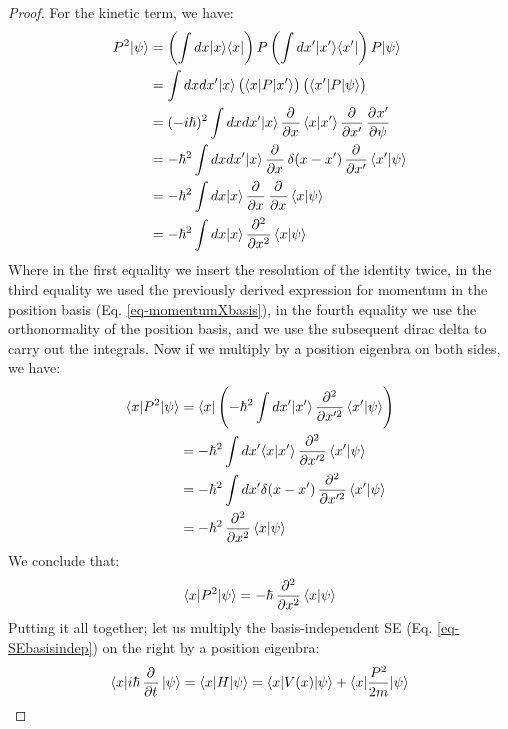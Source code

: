 \begin{proof}
    For the kinetic term, we have:
    \begin{equation}
        \begin{split}
            P^2\ket{\psi} &= \left(\int dx \dyad{x}{x}\right) P \left(\int dx' \dyad{x'}{x'}\right) P\ket{\psi}
            \\ &= \int dxdx' \ket{x}\left(\bra{x}P\ket{x'}\right)\left(\bra{x'}P\ket{\psi}\right)
            \\ &= (-i\hbar)^2 \int dxdx' \ket{x} \dpd{}{x}\braket{x}{x'} \dpd{}{x'}\dpd{x'}{\psi}
            \\ &= -\hbar^2 \int dxdx' \ket{x}\dpd{}{x}\delta(x-x')\dpd{}{x'}\braket{x'}{\psi}
            \\ &= -\hbar^2 \int dx \ket{x} \dpd{}{x}\dpd{}{x}\braket{x}{\psi}
            \\ &= -\hbar^2 \int dx\ket{x} \dpd[2]{}{x}\braket{x}{\psi}
        \end{split}
    \end{equation}
    Where in the first equality we insert the resolution of the identity twice, in the third equality we used the previously derived expression for momentum in the position basis (Eq. \eqref{eq-momentumXbasis}), in the fourth equality we use the orthonormality of the position basis, and we use the subsequent dirac delta to carry out the integrals. Now if we multiply by a position eigenbra on both sides, we have:
    \begin{equation}
        \begin{split}
            \bra{x}P^2\ket{\psi} &= \bra{x}\left(-\hbar^2 \int dx'\ket{x'} \dpd[2]{}{x'}\braket{x'}{\psi}\right)
            \\ &= -\hbar^2 \int dx' \braket{x}{x'}\dpd[2]{}{x'}\braket{x'}{\psi}
            \\ &= -\hbar^2 \int dx' \delta(x - x')\dpd[2]{}{x'}\braket{x'}{\psi}
            \\ &= -\hbar^2 \dpd[2]{}{x}\braket{x}{\psi}
        \end{split}
    \end{equation} 
    We conclude that:
    \begin{equation}
        \bra{x}P^2\ket{\psi} = -\hbar\dpd[2]{}{x} \braket{x}{\psi}
    \end{equation}
    Putting it all together; let us multiply the basis-independent SE (Eq. \eqref{eq-SEbasisindep}) on the right by a position eigenbra:
    \begin{equation}
        \bra{x}i\hbar\dpd{}{t}\ket{\psi} = \bra{x}H\ket{\psi} = \bra{x}V(x)\ket{\psi} + \bra{x}\frac{P^2}{2m}\ket{\psi}

\end{equation}
\end{proof}
